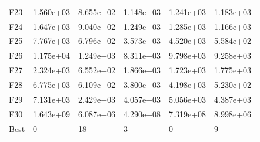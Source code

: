 \begin{tabular}{llllll}
F23  &  1.560e+03 &  8.655e+02 &  1.148e+03 &  1.241e+03 &  1.183e+03 \\
F24  &  1.647e+03 &  9.040e+02 &  1.249e+03 &  1.285e+03 &  1.166e+03 \\
F25  &  7.767e+03 &  6.796e+02 &  3.573e+03 &  4.520e+03 &  5.584e+02 \\
F26  &  1.175e+04 &  1.249e+03 &  8.311e+03 &  9.798e+03 &  9.258e+03 \\
F27  &  2.324e+03 &  6.552e+02 &  1.866e+03 &  1.723e+03 &  1.775e+03 \\
F28  &  6.775e+03 &  6.109e+02 &  3.800e+03 &  4.198e+03 &  5.230e+02 \\
F29  &  7.131e+03 &  2.429e+03 &  4.057e+03 &  5.056e+03 &  4.387e+03 \\
F30  &  1.643e+09 &  6.087e+06 &  4.290e+08 &  7.319e+08 &  8.998e+06 \\
Best &          0 &         18 &          3 &          0 &          9 \\
\bottomrule
\end{tabular}
